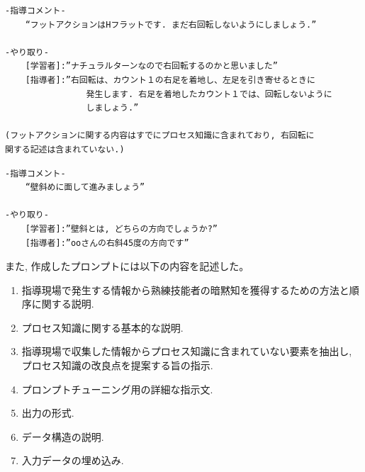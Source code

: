 \begin{tcolorbox}[breakable, colback=white, colframe=black]
    \begin{verbatim}
-指導コメント-
    “フットアクションはHフラットです. まだ右回転しないようにしましょう.”

-やり取り-
    [学習者]:”ナチュラルターンなので右回転するのかと思いました”
    [指導者]:”右回転は、カウント１の右足を着地し、左足を引き寄せるときに
                発生します. 右足を着地したカウント１では、回転しないように
                しましょう.”

(フットアクションに関する内容はすでにプロセス知識に含まれており, 右回転に
関する記述は含まれていない.)
    \end{verbatim}
\end{tcolorbox}
    
\label{fig14}




\begin{tcolorbox}[breakable, colback=white, colframe=black]
    \begin{verbatim}
-指導コメント-
    “壁斜めに面して進みましょう”

-やり取り-
    [学習者]:”壁斜とは, どちらの方向でしょうか?”
    [指導者]:”ooさんの右斜45度の方向です”
    \end{verbatim}
\end{tcolorbox}
    
\label{fig15}



また, 作成したプロンプトには以下の内容を記述した。
\begin{enumerate}
    \item 指導現場で発生する情報から熟練技能者の暗黙知を獲得するための方法と順序に関する説明.
    \item プロセス知識に関する基本的な説明.
    \item 指導現場で収集した情報からプロセス知識に含まれていない要素を抽出し, プロセス知識の改良点を提案する旨の指示.
    \item プロンプトチューニング用の詳細な指示文.
    \item 出力の形式.
    \item データ構造の説明.
    \item 入力データの埋め込み.	
\end{enumerate}



